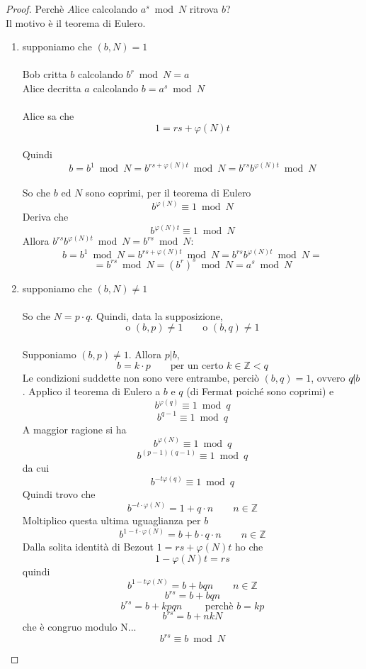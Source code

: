\documentclass[a4paper,12pt, oneside]{book}
\begin{document}
		\newpage
		\begin{proof}
			Perchè $A\mbox{lice}$ calcolando $a^s \bmod N$ ritrova $b$?\\
			Il motivo è il teorema di Eulero.
			\begin{enumerate}
				\item supponiamo che $(b, N) = 1$\\\\
					Bob critta $b$ calcolando $b^r \bmod N = a$\\
					Alice decritta $a$ calcolando $b = a^s \bmod N$\\\\
					
					Alice sa che $$1 = rs + \varphi(N)t$$\\
					Quindi $$b = b^1 \bmod N = b^{rs + \varphi(N)t} \bmod N = b^{rs} b^{\varphi(N)t} \bmod N$$\\
					So che $b$ ed $N$ sono coprimi, per il teorema di Eulero $$b^{\varphi(N)} \equiv 1 \bmod N$$
					Deriva che $$b^{\varphi(N)t} \equiv 1 \bmod N$$
					Allora $b^{rs} b^{\varphi(N)t} \bmod N= b^{rs} \bmod N$:
					$$b = b^1 \bmod N = b^{rs + \varphi(N)t} \bmod N= b^{rs} b^{\varphi(N)t} \bmod N=$$ $$= b^{rs} \bmod N = (b^r)^s \bmod N = a^s \bmod N$$
					
				\item supponiamo che $(b, N) \not = 1$\\\\
					So che $N = p \cdot q$. Quindi, data la supposizione,
					$$\mbox{o } (b,p) \not=1 \qquad \mbox{o } (b,q) \not=1 $$\\
					Supponiamo $(b,p) \not=1$. Allora $p|b$,
					$$b = k \cdot p \qquad \mbox{per un certo } k \in \mathbb{Z} < q$$
					Le condizioni suddette non sono vere entrambe, perciò $(b,q)=1$, ovvero $q \not| b$.
					Applico il teorema di Eulero a $b$ e $q$ (di Fermat poiché sono coprimi) e 
					$$b^{\varphi(q)} \equiv 1 \bmod q$$
					$$b^{q-1} \equiv 1 \bmod q$$
					A maggior ragione si ha
					$$b^{\varphi(N)} \equiv 1 \bmod q$$
					$$b^{(p-1)(q-1)} \equiv 1 \bmod q$$
					da cui
					$$b^{-t\varphi(q)} \equiv 1 \bmod q$$
					Quindi trovo che 
					$$b^{-t \cdot \varphi(N)} = 1 + q \cdot n \qquad n \in \mathbb{Z}$$
					Moltiplico questa ultima uguaglianza per $b$
					$$b^{1-t \cdot \varphi(N)} = b + b \cdot q \cdot n \qquad n \in \mathbb{Z}$$
					Dalla solita identità di Bezout $1 = rs + \varphi(N)t$ ho che $$1-\varphi(N)t = rs$$ quindi
					$$b^{1-t \varphi(N)} = b + b q n \qquad n \in \mathbb{Z}$$
					$$b^{rs} = b + bqn$$
					$$b^{rs} = b + kpqn \qquad \mbox{ perchè } b=kp$$
					$$b^{rs} = b + nkN$$ che è congruo modulo N...
					$$b^{rs} \equiv b \bmod N$$				
			\end{enumerate}
		\end{proof}
	
\end{document}
